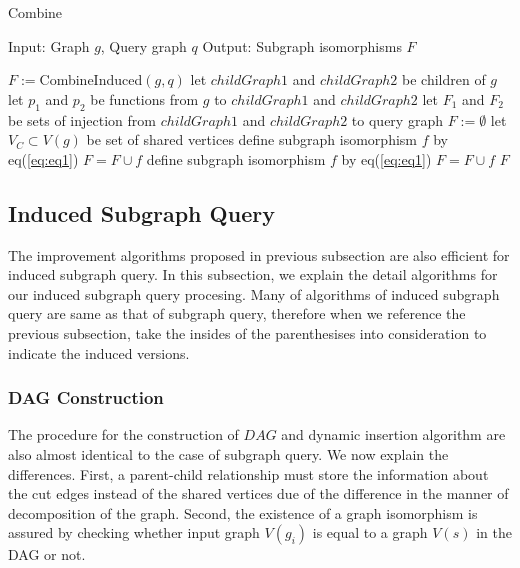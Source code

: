 \begin{algorithm}
\caption{Combine}
\label{alg:alg11}
\begin{algorithmic}
\STATE Input: Graph $g$, Query graph $q$
\STATE Output: Subgraph isomorphisms $F$
\end{algorithmic}
\begin{algorithmic}[1]
	\STATE $F := $CombineInduced$(g,q)$
\ELSE
	\STATE let $childGraph1$ and $childGraph2$ be children of $g$
	\STATE let $p_1$ and $p_2$ be functions from $g$ to $childGraph1$ and $childGraph2$
	\STATE let $F_1$ and $F_2$ be sets of injection from $childGraph1$ and $childGraph2$ to query graph
	\STATE $F := \emptyset$
		\STATE let $V_C \subset V(g)$ be set of shared vertices
					\STATE define subgraph isomorphism $f$ by eq(\ref{eq:eq1})
					\STATE $F = F \cup f $
				\ENDIF
			\ENDIF
		\ENDFOR
	\ELSE
				\STATE define subgraph isomorphism $f$ by eq(\ref{eq:eq1})
				\STATE $F = F \cup f $
			\ENDIF
		\ENDFOR
	\ENDIF
\ENDIF
\RETURN $F$
\end{algorithmic}
\end{algorithm}

\subsection{Induced Subgraph Query}
The improvement algorithms proposed in previous subsection are also efficient for induced subgraph query.
In this subsection, we explain the detail algorithms for our induced subgraph query procesing.
Many of algorithms of induced subgraph query are same as that of subgraph query, therefore when we reference the 
previous subsection, take the insides of the parenthesises into consideration to indicate the induced versions.

\subsubsection{DAG Construction}
The procedure for the construction of $DAG$ and dynamic insertion algorithm are also almost identical to the case of subgraph query.
We now explain the differences. First, a parent-child relationship must store the information about the cut edges instead of the 
shared vertices due of the difference in the manner of decomposition of the graph. Second, the existence of a graph isomorphism is 
assured by checking whether input graph $V(g_i)$ is equal to a graph $V(s)$ in the DAG or not.

